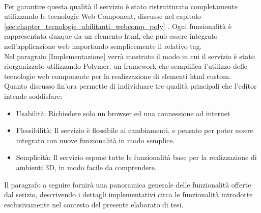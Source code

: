 \\ 
Per garantire questa qualità il servizio è stato ristrutturato completamente utilizzando le tecnologie Web Component, discusse nel capitolo \ref{sec:chapter_tecnologie_abilitanti_webcomp_poly} . Ogni funzionalità è rappresentata dunque da un elemento html, che può essere integrato nell’applicazione web importando semplicemente il relativo tag.
\\
Nel paragrafo [Implementazione] verrà mostrato il modo in cui il servizio è stato riorganizzato utilizzando Polymer, un framework che semplifica l’utilizzo delle tecnologie web componente per la realizzazione di elementi html custom.
\\
Quanto discusso fin’ora permette di individuare tre qualità principali che l’editor intende soddisfare:
\begin{itemize}
\item Usabilità: Richiedere solo un browser ed una connessione ad internet
\item Flessibilità: Il servizio è flessibile ai cambiamenti, e pensato per poter essere integrato con nuove funzionalità in modo semplice.
\item Semplicità: Il servizio espone tutte le funzionalità base per la realizzazione di ambienti 3D, in modo facile da comprendere.
\end{itemize}
Il paragrafo a seguire fornirà una panoramica generale delle funzionalità offerte dal serizio, descrivendo i dettagli implementativi circa le funzionalità introdotte esclusivamente nel contesto del presente elaborato di tesi.